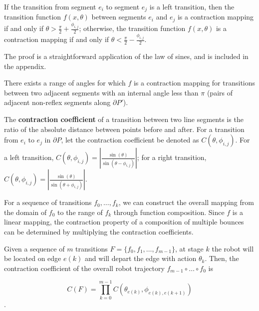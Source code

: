 \documentclass[]{styles/svproc}  %
\begin{document}
\begin{lemma} \label{lemma:angrange}
If the transition from segment $e_i$ to segment $e_j$ is a left transition, then the
transition function $f(x, \theta)$ between segments $e_i$ and $e_j$ is a contraction
mapping if and only if $\theta > \frac{\pi}{2}+\frac{\phi_{i, j}}{2}$;
otherwise, the transition function $f(x, \theta)$ is a contraction mapping if
and only if $\theta < \frac{\pi}{2}-\frac{\phi_{i, j}}{2}$.
\end{lemma}

The proof is a straightforward application of the law of sines, and is included
in the appendix.

\begin{corollary} \label{coro:existcontract}
There exists a range of angles for which $f$ is a contraction mapping for transitions between two adjacent 
segments with an internal angle less than $\pi$ (pairs of adjacent non-reflex
segments along $\partial P'$).
\end{corollary}

\begin{definition}
The \textbf{contraction coefficient} of a transition between two
line segments is the ratio of the absolute distance between points before and after.
For a transition from $e_i$ to $e_j$ in $\partial P$, let the contraction
coefficient be denoted as $C(\theta, \phi_{i, j})$. 
For a left transition, $C(\theta, \phi_{i, j}) = | \frac{\sin(\theta)}{\sin(\theta - \phi_{i, j})} |$; 
for a right transition,  $C(\theta, \phi_{i, j}) = | \frac{\sin(\theta)}{\sin(\theta + \phi_{i, j})} |$.
\end{definition}

For a sequence of transitions $f_0, \ldots, f_k$, we can construct the overall
mapping from the domain of $f_0$ to the range of $f_k$ through function
composition. Since $f$ is a linear mapping, the contraction property of a composition 
of multiple bounces can be determined by multiplying the contraction
coefficients.

\begin{definition}
Given a sequence of $m$ transitions $F = \{f_0, f_1, \ldots, f_{m-1}\}$, at stage $k$ the robot 
will be located on edge $e(k)$ and will depart the edge with
action $\theta_k$. Then, the contraction coefficient of the overall robot
trajectory $f_{m-1} \circ \ldots \circ f_0$ is

$$ C(F) = \prod_{k=0}^{m-1} C(\theta_{e(k)}, \phi_{e(k), e(k+1)}) $$.
\end{definition}
\end{document}
